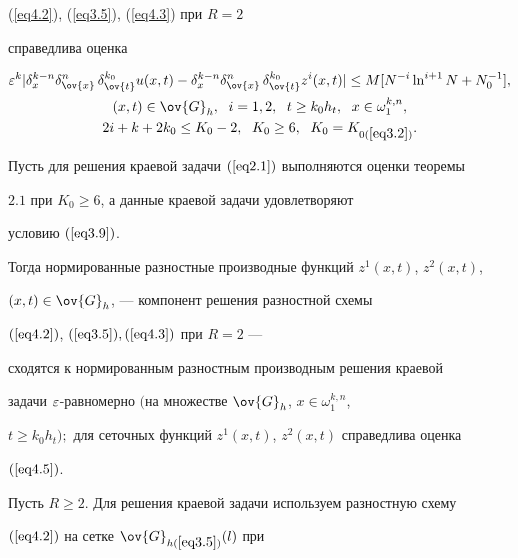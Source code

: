 (\ref{eq4.2}), (\ref{eq3.5}), (\ref{eq4.3}) при $R=2$


справедлива оценка


\begin{gather}


\label{eq4.5}


\eps^{k}|\delta_x^{k-n}\delta^n_{\ov{x}}\,\delta_{\ov{t}}^{k_0}u(x,t)-


\delta^{k-n}_x\delta^n_{\ov{x}}\,\delta^{k_0}_{\ov{t}}z^i(x,t)|\le


M[N^{-i}\ln^{i+1}N+N_0^{-1}],\\


(x,t)\in\ov{G}_h,\ \; i=1,2, \ \; t\ge k_0h_t,


\ \; x\in\omega_1^{k,n}, \notag\\


2i+k+2k_0\le K_0-2,\ \; K_0\ge 6,\ \; K_0=K_{0(\ref{eq3.2})}. \notag


\end{gather}





\begin{lems}


Пусть для решения краевой задачи $(\ref{eq2.1})$ выполняются оценки теоремы


$2.1$ при $K_0\ge 6$, а данные краевой задачи удовлетворяют


условию $(\ref{eq3.9})$.


Тогда нормированные разностные производные  функций $z^1(x,t)$, $z^2(x,t)$,


$(x,t)\in\ov{G}_h$, --- компонент решения разностной схемы


$(\ref{eq4.2})$, $(\ref{eq3.5}), (\ref{eq4.3})$ при $R=2$ ---


сходятся к нормированным разностным производным решения краевой 


задачи $\varepsilon$-равномерно $($на множестве $\ov{G}_h$, $x\in\omega_1^{k,n}$,


$t\ge k_0h_t);$ для сеточных функций $z^1(x,t)$, $z^2(x,t)$ справедлива оценка


$(\ref{eq4.5})$.


\end{lems}





Пусть $R\ge 2$. Для решения краевой задачи используем разностную схему


$(\ref{eq4.2})$ на сетке $\ov{G}_{h(\ref{eq3.5})}(l)$ при



